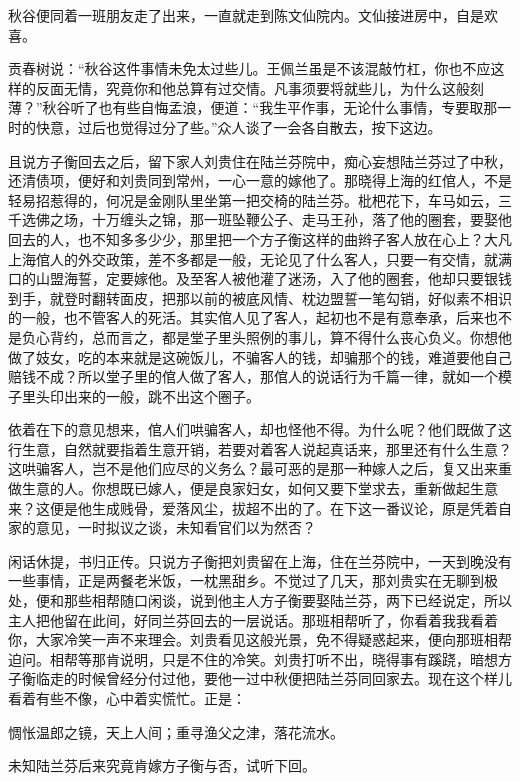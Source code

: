 \documentclass[12pt,UTF8]{ctexbook}
\begin{document}
{{{秋谷便同着一班朋友走了出来，一直就走到陈文仙院内。文仙接进房中，自是欢喜。

贡春树说：“秋谷这件事情未免太过些儿。王佩兰虽是不该混敲竹杠，你也不应这样的反面无情，究竟你和他总算有过交情。凡事须要将就些儿，为什么这般刻薄？”秋谷听了也有些自悔孟浪，便道：“我生平作事，无论什么事情，专要取那一时的快意，过后也觉得过分了些。”众人谈了一会各自散去，按下这边。

且说方子衡回去之后，留下家人刘贵住在陆兰芬院中，痴心妄想陆兰芬过了中秋，还清债项，便好和刘贵同到常州，一心一意的嫁他了。那晓得上海的红倌人，不是轻易招惹得的，何况是金刚队里坐第一把交椅的陆兰芬。枇杷花下，车马如云，三千选佛之场，十万缠头之锦，那一班坠鞭公子、走马王孙，落了他的圈套，要娶他回去的人，也不知多多少少，那里把一个方子衡这样的曲辫子客人放在心上？大凡上海倌人的外交政策，差不多都是一般，无论见了什么客人，只要一有交情，就满口的山盟海誓，定要嫁他。及至客人被他灌了迷汤，入了他的圈套，他却只要银钱到手，就登时翻转面皮，把那以前的被底风情、枕边盟誓一笔勾销，好似素不相识的一般，也不管客人的死活。其实倌人见了客人，起初也不是有意奉承，后来也不是负心背约，总而言之，都是堂子里头照例的事儿，算不得什么丧心负义。你想他做了妓女，吃的本来就是这碗饭儿，不骗客人的钱，却骗那个的钱，难道要他自己赔钱不成？所以堂子里的倌人做了客人，那倌人的说话行为千篇一律，就如一个模子里头印出来的一般，跳不出这个圈子。

依着在下的意见想来，倌人们哄骗客人，却也怪他不得。为什么呢？他们既做了这行生意，自然就要指着生意开销，若要对着客人说起真话来，那里还有什么生意？这哄骗客人，岂不是他们应尽的义务么？最可恶的是那一种嫁人之后，复又出来重做生意的人。你想既已嫁人，便是良家妇女，如何又要下堂求去，重新做起生意来？这便是他生成贱骨，爱落风尘，拔超不出的了。在下这一番议论，原是凭着自家的意见，一时拟议之谈，未知看官们以为然否？

闲话休提，书归正传。只说方子衡把刘贵留在上海，住在兰芬院中，一天到晚没有一些事情，正是两餐老米饭，一枕黑甜乡。不觉过了几天，那刘贵实在无聊到极处，便和那些相帮随口闲谈，说到他主人方子衡要娶陆兰芬，两下已经说定，所以主人把他留在此间，好同兰芬回去的一层说话。那班相帮听了，你看着我我看着你，大家冷笑一声不来理会。刘贵看见这般光景，免不得疑惑起来，便向那班相帮迫问。相帮等那肯说明，只是不住的冷笑。刘贵打听不出，晓得事有蹊跷，暗想方子衡临走的时候曾经分付过他，要他一过中秋便把陆兰芬同回家去。现在这个样儿看着有些不像，心中着实慌忙。正是：

惆怅温郎之镜，天上人间；重寻渔父之津，落花流水。

未知陆兰芬后来究竟肯嫁方子衡与否，试听下回。





}}}
\end{document}
